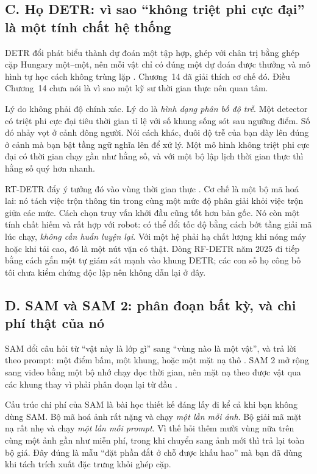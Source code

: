 \documentclass[../../deep_learning.tex]{subfiles}
\begin{document}
\subsection{C. Họ DETR: vì sao ``không triệt phi cực đại'' là một tính chất hệ thống}
DETR đổi phát biểu thành dự đoán một tập hợp, ghép với chân trị bằng ghép cặp Hungary một--một, nên mỗi vật chỉ có đúng một dự đoán được thưởng và mô hình tự học cách không trùng lặp \cite{carion2020detr}. Chương~14 đã giải thích cơ chế đó. Điều Chương~14 chưa nói là vì sao một kỹ sư thời gian thực nên quan tâm.

Lý do không phải độ chính xác. Lý do là \emph{hình dạng phân bố độ trễ}. Một detector có triệt phi cực đại tiêu thời gian tỉ lệ với số khung sống sót sau ngưỡng điểm. Số đó nhảy vọt ở cảnh đông người. Nói cách khác, đuôi độ trễ của bạn dày lên đúng ở cảnh mà bạn bật tầng ngữ nghĩa lên để xử lý. Một mô hình không triệt phi cực đại có thời gian chạy gần như hằng số, và với một bộ lập lịch thời gian thực thì hằng số quý hơn nhanh.


RT-DETR đẩy ý tưởng đó vào vùng thời gian thực \cite{zhao2024rtdetr}. Cơ chế là một bộ mã hoá lai: nó tách việc trộn thông tin trong cùng một mức độ phân giải khỏi việc trộn giữa các mức. Cách chọn truy vấn khởi đầu cũng tốt hơn bản gốc. Nó còn một tính chất hiếm và rất hợp với robot: có thể đổi tốc độ bằng cách bớt tầng giải mã lúc chạy, \emph{không cần huấn luyện lại}. Với một hệ phải hạ chất lượng khi nóng máy hoặc khi tải cao, đó là một nút vặn có thật. Dòng RF-DETR năm 2025 đi tiếp bằng cách gắn một  tự giám sát mạnh vào khung DETR; các con số họ công bố tôi chưa kiểm chứng độc lập nên không dẫn lại ở đây.

\subsection{D. SAM và SAM 2: phân đoạn bất kỳ, và chi phí thật của nó}
SAM đổi câu hỏi từ ``vật này là lớp gì'' sang ``vùng nào là một vật'', và trả lời theo prompt: một điểm bấm, một khung, hoặc một mặt nạ thô \cite{kirillov2023sam}. SAM 2 mở rộng sang video bằng một bộ nhớ chạy dọc thời gian, nên mặt nạ theo được vật qua các khung thay vì phải phân đoạn lại từ đầu \cite{ravi2024sam2}.

Cấu trúc chi phí của SAM là bài học thiết kế đáng lấy đi kể cả khi bạn không dùng SAM. Bộ mã hoá ảnh rất nặng và chạy \emph{một lần mỗi ảnh}. Bộ giải mã mặt nạ rất nhẹ và chạy \emph{một lần mỗi prompt}. Vì thế hỏi thêm mười vùng nữa trên cùng một ảnh gần như miễn phí, trong khi chuyển sang ảnh mới thì trả lại toàn bộ giá. Đây đúng là mẫu ``đặt phần đắt ở chỗ được khấu hao'' mà bạn đã dùng khi tách trích xuất đặc trưng khỏi ghép cặp.
\end{document}

